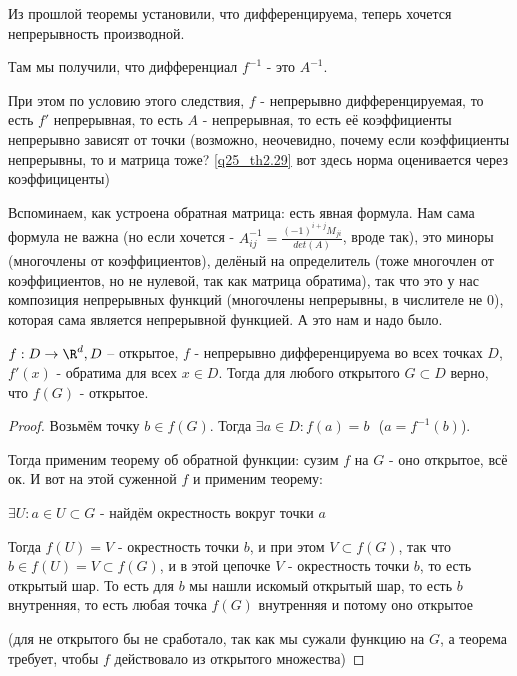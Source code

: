     \begin{consequence}

        \thmslashn

        Из прошлой теоремы установили, что дифференцируема, теперь хочется непрерывность производной.

        Там мы получили, что дифференциал $f^{-1}$ - это $A^{-1}$. 

        При этом по условию этого следствия, $f$ - непрерывно дифференцируемая, то есть $f'$ непрерывная, то есть $A$ - непрерывная, то есть её коэффициенты непрерывно зависят от точки (возможно, неочевидно, почему если коэффициенты непрерывны, то и матрица тоже? \ref{q25_th2.29} вот здесь норма оценивается через коэффициценты)

        Вспоминаем, как устроена обратная матрица: есть явная формула. Нам сама формула не важна (но если хочется - $A_{ij}^{-1} = \frac{(-1)^{i+j} M_{ji}}{det(A)}$, вроде так), это миноры (многочлены от коэффициентов), делёный на определитель (тоже многочлен от коэффициентов, но не нулевой, так как матрица обратима), так что это у нас композиция непрерывных функций (многочлены непрерывны, в числителе не 0), которая сама является непрерывной функцией. А это нам и надо было.
    \end{consequence}

    \begin{consequence}

        $f: D \to \R^d, D$ -- открытое, $f$ - непрерывно дифференцируема во всех точках $D$, $f'(x)$ - обратима для всех $x \in D$. Тогда для любого открытого $G \subset D$ верно, что $f(G)$ - открытое.
    \end{consequence}

    \begin{proof} \thmslashn

        Возьмём точку $b \in f(G)$. Тогда $\exists a \in D: f(a) = b$ \,\,($a = f^{-1}(b)$). 

        Тогда применим теорему об обратной функции: сузим $f$ на $G$ - оно открытое, всё ок. И вот на этой суженной $f$ и применим теорему: 

        $\exists U: a \in U \subset G$ - найдём окрестность вокруг точки $a$

        Тогда $f(U) = V$ - окрестность точки $b$, и при этом $V \subset f(G)$, так что $b \in f(U) = V \subset f(G)$, и в этой цепочке $V$ - окрестность точки $b$, то есть открытый шар. То есть для $b$ мы нашли искомый открытый шар, то есть $b$ внутренняя, то есть любая точка $f(G)$ внутренняя и потому оно открытое

        (для не открытого бы не сработало, так как мы сужали функцию на $G$, а теорема требует, чтобы $f$ действовало из открытого множества)
    \end{proof}

